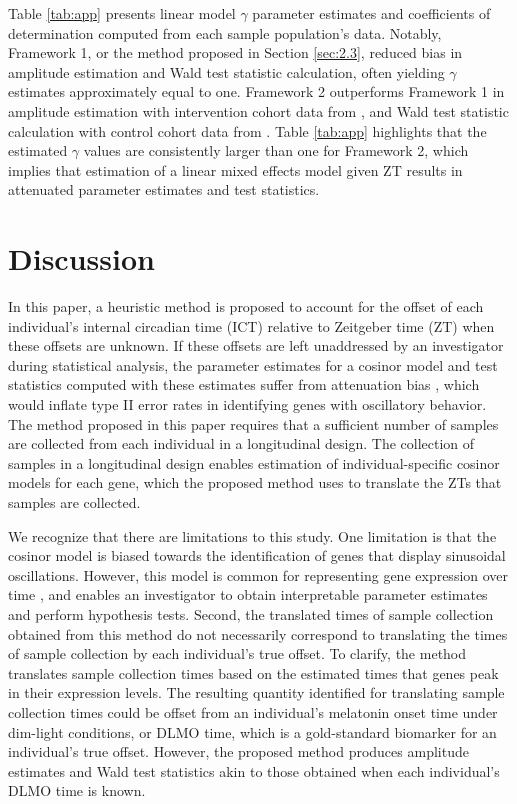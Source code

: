 Table \ref{tab:app} presents linear model $\gamma$ parameter estimates and coefficients of determination computed from each sample population's data. Notably, Framework 1, or the method proposed in Section \ref{sec:2.3}, reduced bias in amplitude estimation and Wald test statistic calculation, often yielding $\gamma$ estimates approximately equal to one. Framework 2 outperforms Framework 1 in amplitude estimation with intervention cohort data from \cite{Archer2014}, and Wald test statistic calculation with control cohort data from \cite{Archer2014}. Table \ref{tab:app} highlights that the estimated $\gamma$ values are consistently larger than one for Framework 2, which implies that estimation of a linear mixed effects model given ZT results in attenuated parameter estimates and test statistics.

\section{Discussion} \label{sec:5}

In this paper, a heuristic method is proposed to account for the offset of each individual's internal circadian time (ICT) relative to Zeitgeber time (ZT) when these offsets are unknown. If these offsets are left unaddressed by an investigator during statistical analysis, the parameter estimates for a cosinor model and test statistics computed with these estimates suffer from attenuation bias \citep{Sollberger1962, Weaver1995, Gorczyca2023, Gorczyca2024}, which would inflate type II error rates in identifying genes with oscillatory behavior. The method proposed in this paper requires that a sufficient number of samples are collected from each individual in a longitudinal design. The collection of samples in a longitudinal design enables estimation of individual-specific cosinor models for each gene, which the proposed method uses to translate the ZTs that samples are collected.

We recognize that there are limitations to this study. One limitation is that the cosinor model is biased towards the identification of genes that display sinusoidal oscillations. However, this model is common for representing gene expression over time \citep{Archer2014, delolmo2022, Fontana2012, Hou2021, MllerLevet2013}, and enables an investigator to obtain interpretable parameter estimates and perform hypothesis tests. Second, the translated times of sample collection obtained from this method do not necessarily correspond to translating the times of sample collection by each individual's true offset. To clarify, the method translates sample collection times based on the estimated times that genes peak in their expression levels. The resulting quantity identified for translating sample collection times could be offset from an individual's melatonin onset time under dim-light conditions, or DLMO time, which is a gold-standard biomarker for an individual's true offset. However, the proposed method produces amplitude estimates and Wald test statistics akin to those obtained when each individual's DLMO time is known.


